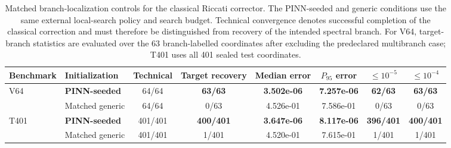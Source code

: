 \begin{table}[t]
\centering
\caption{
Matched branch-localization controls for the classical Riccati corrector.
The PINN-seeded and generic conditions use the same external local-search
policy and search budget. Technical convergence denotes successful
completion of the classical correction and must therefore be distinguished
from recovery of the intended spectral branch. For V64, target-branch
statistics are evaluated over the 63 branch-labelled coordinates after
excluding the predeclared multibranch case; T401 uses all 401 sealed test
coordinates.
}
\label{tab:matched_branch_localization}
\small
\setlength{\tabcolsep}{4.2pt}
\begin{tabular}{llcccccc}
\toprule
Benchmark
& Initialization
& Technical
& Target recovery
& Median error
& $P_{95}$ error
& $\leq 10^{-5}$
& $\leq 10^{-4}$ \\
\midrule
V64 & \textbf{PINN-seeded} & 64/64 & \textbf{63/63} & \textbf{3.502e-06} & \textbf{7.257e-06} & \textbf{62/63} & \textbf{63/63} \\
 & Matched generic & 64/64 & 0/63 & 4.526e-01 & 7.586e-01 & 0/63 & 0/63 \\
\midrule
T401 & \textbf{PINN-seeded} & 401/401 & \textbf{400/401} & \textbf{3.647e-06} & \textbf{8.117e-06} & \textbf{396/401} & \textbf{400/401} \\
 & Matched generic & 401/401 & 1/401 & 4.520e-01 & 7.615e-01 & 1/401 & 1/401 \\
\bottomrule
\end{tabular}
\end{table}

